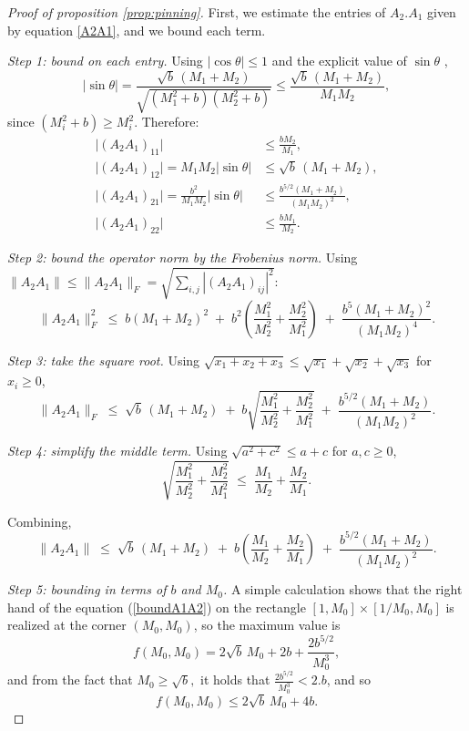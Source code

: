 \documentclass[a4paper,11pt]{article}
\theoremstyle{definition}
\begin{document}
\begin{proof}[Proof of proposition \ref{prop:pinning}] First, we estimate the entries of $A_2.A_1$ given by equation \ref{A2A1}, and we bound each term.

\noindent\emph{Step 1: bound on each entry.}
Using $|\cos\theta| \leq 1$ and the explicit value of $\sin\theta$ ,
\[
|\sin\theta| = \frac{\sqrt b\,(M_1+M_2)}{\sqrt{(M_1^2+b)(M_2^2+b)}} \leq \frac{\sqrt b\,(M_1+M_2)}{M_1 M_2},
\]
since $(M_i^2 + b) \geq M_i^2$. Therefore:
\begin{align*}
\bigl|(A_2 A_1)_{11}\bigr| &\leq \frac{b M_2}{M_1}, \\[4pt]
\bigl|(A_2 A_1)_{12}\bigr| = M_1 M_2 |\sin\theta| &\leq \sqrt b\,(M_1+M_2), \\[4pt]
\bigl|(A_2 A_1)_{21}\bigr| = \frac{b^2}{M_1 M_2}|\sin\theta| &\leq \frac{b^{5/2}(M_1+M_2)}{(M_1 M_2)^2}, \\[4pt]
\bigl|(A_2 A_1)_{22}\bigr| &\leq \frac{b M_1}{M_2}.
\end{align*}

\medskip

\noindent\emph{Step 2: bound the operator norm by the Frobenius norm.} Using $\|A_2 A_1\| \leq \|A_2 A_1\|_F = \sqrt{\sum_{i,j} |(A_2 A_1)_{ij}|^2}$:
\[
\|A_2 A_1\|_F^2 \;\leq\; b(M_1+M_2)^2 \;+\; b^2\!\left(\frac{M_1^2}{M_2^2} + \frac{M_2^2}{M_1^2}\right) \;+\; \frac{b^5(M_1+M_2)^2}{(M_1 M_2)^4}.
\]

\medskip

\noindent\emph{Step 3: take the square root.} Using $\sqrt{x_1 + x_2 + x_3} \leq \sqrt{x_1} + \sqrt{x_2} + \sqrt{x_3}$ for $x_i \geq 0$,
\[
\|A_2 A_1\|_F \;\leq\; \sqrt b\,(M_1+M_2) \;+\; b\sqrt{\frac{M_1^2}{M_2^2} + \frac{M_2^2}{M_1^2}} \;+\; \frac{b^{5/2}(M_1+M_2)}{(M_1 M_2)^2}.
\]

\medskip

\noindent\emph{Step 4: simplify the middle term.} Using $\sqrt{a^2 + c^2} \leq a + c$ for $a, c \geq 0$,
\[
\sqrt{\frac{M_1^2}{M_2^2} + \frac{M_2^2}{M_1^2}} \;\leq\; \frac{M_1}{M_2} + \frac{M_2}{M_1}.
\]


Combining,
\[
\|A_2 A_1\| \;\leq\; \sqrt b\,(M_1+M_2) \;+\; b\!\left(\frac{M_1}{M_2} + \frac{M_2}{M_1}\right) \;+\; \frac{b^{5/2}(M_1+M_2)}{(M_1 M_2)^2}. 
\]

\noindent\emph{Step 5: bounding in terms of $b$ and $M_0$.}  A simple calculation shows that the right hand of the equation (\ref{boundA1A2})  on the rectangle $[1, M_0] \times [1/M_0, M_0]$ is realized at the corner $(M_0, M_0)$, so the maximum value is 
\[
f(M_0, M_0) = 2\sqrt b\, M_0 + 2b + \frac{2 b^{5/2}}{M_0^3}, 
\]
and from the fact that $M_0\geq \sqrt b,$ it holds that $\frac{2 b^{5/2}}{M_0^3}< 2. b$, and so 
\[
f(M_0, M_0) \leq 2\sqrt b\, M_0 + 4b. 
\]



\end{proof}
\end{document}
